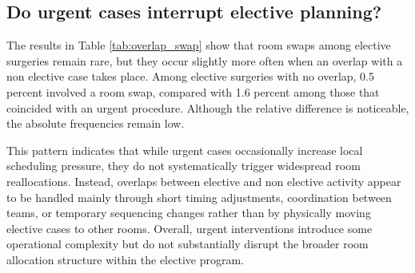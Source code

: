 \documentclass[
]{article}
\begin{document}
\subsection{Do urgent cases interrupt elective
planning?}\label{do-urgent-cases-interrupt-elective-planning}

The results in Table \ref{tab:overlap_swap} show that room swaps among
elective surgeries remain rare, but they occur slightly more often when
an overlap with a non elective case takes place. Among elective
surgeries with no overlap, 0.5 percent involved a room swap, compared
with 1.6 percent among those that coincided with an urgent procedure.
Although the relative difference is noticeable, the absolute frequencies
remain low.

This pattern indicates that while urgent cases occasionally increase
local scheduling pressure, they do not systematically trigger widespread
room reallocations. Instead, overlaps between elective and non elective
activity appear to be handled mainly through short timing adjustments,
coordination between teams, or temporary sequencing changes rather than
by physically moving elective cases to other rooms. Overall, urgent
interventions introduce some operational complexity but do not
substantially disrupt the broader room allocation structure within the
elective program.
\end{document}
